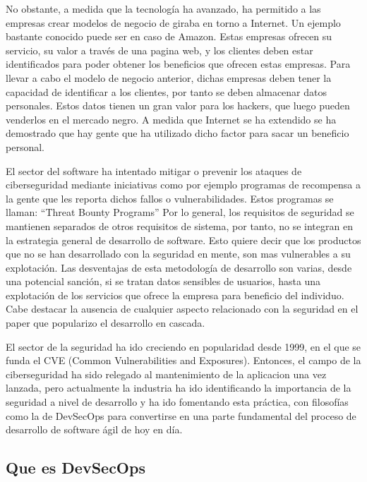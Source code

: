 \documentclass[12pt]{report} %
\begin{document}
No obstante, a medida que la tecnología ha avanzado, ha permitido a las empresas
crear modelos de negocio de giraba en torno a Internet.  Un ejemplo bastante
conocido puede ser en caso de Amazon.  Estas empresas ofrecen su servicio, su
valor a través de una pagina web, y los clientes deben estar identificados para
poder obtener los beneficios que ofrecen estas empresas.  Para llevar a cabo el
modelo de negocio anterior, dichas empresas deben tener la capacidad de
identificar a los clientes, por tanto se deben almacenar datos personales.
Estos datos tienen un gran valor para los hackers, que luego pueden venderlos en
el mercado negro.  A medida que Internet se ha extendido se ha demostrado que
hay gente que ha utilizado dicho factor para sacar un beneficio personal.

El sector del software ha intentado mitigar o prevenir los ataques de
ciberseguridad mediante iniciativas como por ejemplo programas de recompensa a
la gente que les reporta dichos fallos o vulnerabilidades.  Estos programas se
llaman: ``Threat Bounty Programs'' Por lo general, los requisitos de seguridad
se mantienen separados de otros requisitos de sistema, por tanto, no se integran
en la estrategia general de desarrollo de software. \cite{Flec2003} Esto quiere
decir que los productos que no se han desarrollado con la seguridad en mente,
son mas vulnerables a su explotación.  Las desventajas de esta metodología de
desarrollo son varias, desde una potencial sanción, si se tratan datos sensibles
de usuarios, hasta una explotación de los servicios que ofrece la empresa para
beneficio del individuo.  Cabe destacar la ausencia de cualquier aspecto
relacionado con la seguridad en el paper que popularizo el desarrollo en
cascada. \cite{royce1970}

El sector de la seguridad ha ido creciendo en popularidad desde 1999, en el que
se funda el CVE (Common Vulnerabilities and Exposures).  Entonces, el campo de
la ciberseguridad ha sido relegado al mantenimiento de la aplicacion una vez
lanzada, pero actualmente la industria ha ido identificando la importancia de la
seguridad a nivel de desarrollo y ha ido fomentando esta práctica, con
filosofías como la de DevSecOps para convertirse en una parte fundamental del
proceso de desarrollo de software ágil de hoy en día.

\subsection{Que es DevSecOps}
\end{document}
